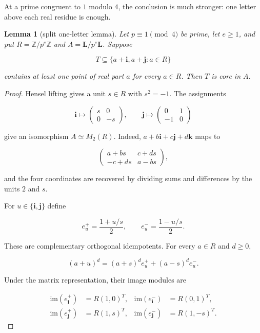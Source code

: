 \documentclass[11pt]{article}
\newtheorem{lemma}[theorem]{Lemma}
\theoremstyle{remark}
\numberwithin{equation}{section}
\begin{document}
At a prime congruent to $1$ modulo $4$, the conclusion is much stronger: one
letter above each real residue is enough.

\begin{lemma}[split one-letter lemma]

Let $p\equiv1\pmod4$ be prime, let $e\ge1$, and put
$R=\mathbb Z/p^e\mathbb Z$ and $A=\mathbf L/p^e\mathbf L$. Suppose

\[
T\subseteq\{a+\mathbf i,a+\mathbf j:a\in R\}
\]

contains at least one point of real part $a$ for every $a\in R$. Then $T$ is
core in $A$.

\end{lemma}
\begin{proof}

Hensel lifting gives a unit $s\in R$ with $s^2=-1$. The assignments

\[
\mathbf i\longmapsto
\begin{pmatrix}s&0\\0&-s\end{pmatrix},
\qquad
\mathbf j\longmapsto
\begin{pmatrix}0&1\\-1&0\end{pmatrix}
\]

give an isomorphism $A\simeq M_2(R)$. Indeed,
$a+b\mathbf i+c\mathbf j+d\mathbf k$ maps to

\[
\begin{pmatrix}
a+bs&c+ds\\
-c+ds&a-bs
\end{pmatrix},
\]

and the four coordinates are recovered by dividing sums and differences by
the units $2$ and $s$.

For $u\in\{\mathbf i,\mathbf j\}$ define

\[
e_u^+=\frac{1+u/s}{2},
\qquad
e_u^-=\frac{1-u/s}{2}.
\]

These are complementary orthogonal idempotents. For every $a\in R$ and
$d\ge0$,

\[
(a+u)^d=(a+s)^d e_u^+ +(a-s)^d e_u^-.
\]

Under the matrix representation, their image modules are

\[
\begin{aligned}
\mathrm{im}(e_{\mathbf i}^+)&=R(1,0)^T,
&\mathrm{im}(e_{\mathbf i}^-)&=R(0,1)^T,\\
\mathrm{im}(e_{\mathbf j}^+)&=R(1,s)^T,
&\mathrm{im}(e_{\mathbf j}^-)&=R(1,-s)^T.
\end{aligned}
\]


\end{proof}
\end{document}
